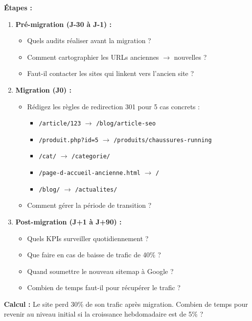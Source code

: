 \documentclass[12pt,a4paper]{report}
\begin{document}
\textbf{\'{E}tapes :}
\begin{enumerate}
    \item \textbf{Pr\'{e}-migration (J-30 \`{a} J-1) :}
    \begin{itemize}
        \item Quels audits r\'{e}aliser avant la migration ?
        \item Comment cartographier les URLs anciennes $\rightarrow$ nouvelles ?
        \item Faut-il contacter les sites qui linkent vers l'ancien site ?
    \end{itemize}

    \item \textbf{Migration (J0) :}
    \begin{itemize}
        \item R\'{e}digez les r\`{e}gles de redirection 301 pour 5 cas concrets :
        \begin{itemize}
            \item \texttt{/article/123} $\rightarrow$ \texttt{/blog/article-seo}
            \item \texttt{/produit.php?id=5} $\rightarrow$ \texttt{/produits/chaussures-running}
            \item \texttt{/cat/} $\rightarrow$ \texttt{/categorie/}
            \item \texttt{/page-d-accueil-ancienne.html} $\rightarrow$ \texttt{/}
            \item \texttt{/blog/} $\rightarrow$ \texttt{/actualites/}
        \end{itemize}
        \item Comment g\'{e}rer la p\'{e}riode de transition ?
    \end{itemize}

    \item \textbf{Post-migration (J+1 \`{a} J+90) :}
    \begin{itemize}
        \item Quels KPIs surveiller quotidiennement ?
        \item Que faire en cas de baisse de trafic de 40\% ?
        \item Quand soumettre le nouveau sitemap \`{a} Google ?
        \item Combien de temps faut-il pour r\'{e}cup\'{e}rer le trafic ?
    \end{itemize}
\end{enumerate}

\textbf{Calcul :} Le site perd 30\% de son trafic apr\`{e}s migration. Combien de temps pour revenir au niveau initial si la croissance hebdomadaire est de 5\% ?
\end{document}
